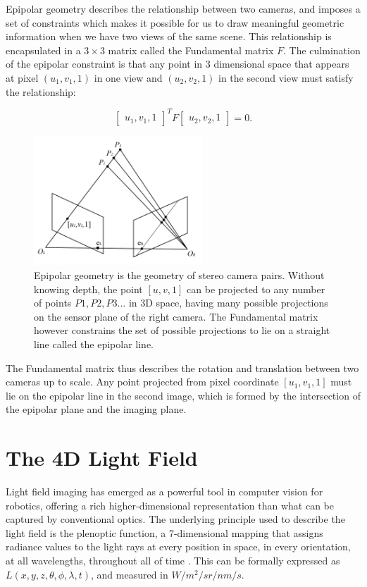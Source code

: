Epipolar geometry describes the relationship between two cameras, and imposes a set of constraints which makes it possible for us to draw meaningful geometric information when we have two views of the same scene. This relationship is encapsulated in a $3 \times 3$ matrix called the Fundamental matrix $F$. The culmination of the epipolar constraint is that any point in 3 dimensional space that appears at pixel $(u_1, v_1, 1)$ in one view and $(u_2, v_2, 1)$ in the second view must satisfy the relationship:

\begin{equation}
    \begin{bmatrix}
        u_1, v_1, 1
    \end{bmatrix}^T
    F
    \begin{bmatrix}
        u_2, v_2, 1
    \end{bmatrix}
    = 0.
\end{equation}

\begin{figure}
    \centering
    \includegraphics[width=2.5in]{images/epipolarplane.png}
    \caption[The fundamental matrix in epipolar geometry]{Epipolar geometry is the geometry of stereo camera pairs. Without knowing depth, the point $[u,v,1]$ can be projected to any number of points $P1, P2, P3... $ in 3D space, having many possible projections on the sensor plane of the right camera. The Fundamental matrix however constrains the set of possible projections to lie on a straight line called the epipolar line.}
    \label{epipolarplane}
\end{figure}

The Fundamental matrix thus describes the rotation and translation between two cameras up to scale. Any point projected from pixel coordinate $[u_1, v_1, 1]$ must lie on the epipolar line in the second image, which is formed by the intersection of the epipolar plane and the imaging plane. 



\section{The 4D Light Field}
Light field imaging has emerged as a powerful tool in computer vision for robotics, offering a rich higher-dimensional representation than what can be captured by conventional optics. The underlying principle used to describe the light field is the plenoptic function, a 7-dimensional mapping that assigns radiance values to the light rays at every position in space, in every orientation, at all wavelengths, throughout all of time \cite{adelson1991plenoptic}. This can be formally expressed as $L(x,y,z,\theta, \phi, \lambda, t)$, and measured in $W/m^2/sr/nm/s$. 



